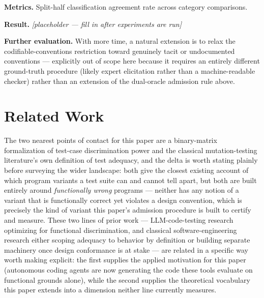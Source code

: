 \documentclass[11pt]{article}
\newcommand{\ph}{\textit{[placeholder --- fill in after experiments are run]}}
\begin{document}
\textbf{Metrics.} Split-half classification agreement rate across category comparisons.

\textbf{Result.} \ph

\vspace{0.5em}
\noindent\textbf{Further evaluation.} With more time, a natural extension is to relax the codifiable-conventions restriction toward genuinely tacit or undocumented conventions --- explicitly out of scope here because it requires an entirely different ground-truth procedure (likely expert elicitation rather than a machine-readable checker) rather than an extension of the dual-oracle admission rule above.

\section{Related Work}

The two nearest points of contact for this paper are a binary-matrix formalization of test-case discrimination power and the classical mutation-testing literature's own definition of test adequacy, and the delta is worth stating plainly before surveying the wider landscape: both give the closest existing account of which program variants a test suite can and cannot tell apart, but both are built entirely around \emph{functionally wrong} programs --- neither has any notion of a variant that is functionally correct yet violates a design convention, which is precisely the kind of variant this paper's admission procedure is built to certify and measure. These two lines of prior work --- LLM-code-testing research optimizing for functional discrimination, and classical software-engineering research either scoping adequacy to behavior by definition or building separate machinery once design conformance is at stake --- are related in a specific way worth making explicit: the first supplies the applied motivation for this paper (autonomous coding agents are now generating the code these tools evaluate on functional grounds alone), while the second supplies the theoretical vocabulary this paper extends into a dimension neither line currently measures.
\end{document}
